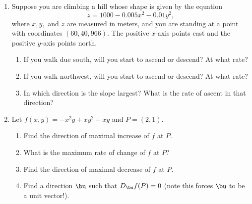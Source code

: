 {\begin{enumerate}
	
	\item Suppose you are climbing a hill whose shape is given by the equation
	\[ z = 1000 - 0.005x^2-0.01y^2, \]
	where $x, y,$ and $z$ are measured in meters, and you are standing at a point with
	coordinates $(60, 40, 966)$. The positive $x$-axis points east and the positive $y$-axis
	points north.
	\begin{enumerate}
		\item If you walk due south, will you start to ascend or descend? At what rate?
		\item If you walk northwest, will you start to ascend or descend? At what rate?
		\item In which direction is the slope largest? What is the rate of ascent in that direction?
	\end{enumerate} 
	\item Let $f(x,y)=-x^2y+xy^2+xy$ and $P=(2,1)$.
	\begin{enumerate}
		\item Find the direction of maximal increase of $f$ at $P$.
		\item What is the maximum rate of change of $f$ at $P$?
		\item Find the direction of maximal decrease of $f$ at $P$.
		\item Find a direction $\bu$ such that $D_{\bu}f(P)=0$ (note this forces $\bu$ to be a unit vector!).
	\end{enumerate}
\end{enumerate}
}{}

